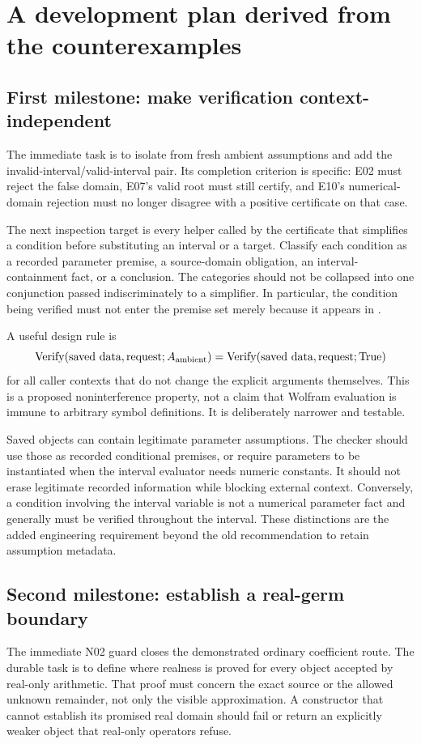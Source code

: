 \documentclass[11pt,a4paper]{article}
\newcommand{\code}[1]{\texttt{\detokenize{#1}}}
\begin{document}
\section{A development plan derived from the counterexamples}\label{sec:plan}

\subsection{First milestone: make verification context-independent}
The immediate task is to isolate \code{InverseCertificate} from fresh ambient assumptions and add the invalid-interval/valid-interval pair. Its completion criterion is specific: E02 must reject the false domain, E07's valid root must still certify, and E10's numerical-domain rejection must no longer disagree with a positive certificate on that case.

The next inspection target is every helper called by the certificate that simplifies a condition before substituting an interval or a target. Classify each condition as a recorded parameter premise, a source-domain obligation, an interval-containment fact, or a conclusion. The categories should not be collapsed into one conjunction passed indiscriminately to a simplifier. In particular, the condition being verified must not enter the premise set merely because it appears in \code{$Assumptions}.

A useful design rule is
\[
 \operatorname{Verify}(\text{saved data},\text{request};A_{\rm ambient})
 =\operatorname{Verify}(\text{saved data},\text{request};\mathrm{True})
\]
for all caller contexts that do not change the explicit arguments themselves. This is a proposed noninterference property, not a claim that Wolfram evaluation is immune to arbitrary symbol definitions. It is deliberately narrower and testable.

Saved objects can contain legitimate parameter assumptions. The checker should use those as recorded conditional premises, or require parameters to be instantiated when the interval evaluator needs numeric constants. It should not erase legitimate recorded information while blocking external context. Conversely, a condition involving the interval variable is not a numerical parameter fact and generally must be verified throughout the interval. These distinctions are the added engineering requirement beyond the old recommendation to retain assumption metadata.

\subsection{Second milestone: establish a real-germ boundary}
The immediate N02 guard closes the demonstrated ordinary coefficient route. The durable task is to define where realness is proved for every object accepted by real-only arithmetic. That proof must concern the exact source or the allowed unknown remainder, not only the visible approximation. A constructor that cannot establish its promised real domain should fail or return an explicitly weaker object that real-only operators refuse.
\end{document}
